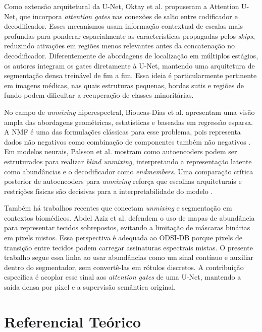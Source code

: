 \documentclass[conference]{IEEEtran}
\begin{document}
Como extensão arquitetural da U-Net, Oktay et al. \cite{oktay2018attentionunet}
propuseram a Attention U-Net, que incorpora \textit{attention gates} nas
conexões de salto entre codificador e decodificador. Esses mecanismos usam
informação contextual de escalas mais profundas para ponderar espacialmente as
características propagadas pelos \textit{skips}, reduzindo ativações em regiões
menos relevantes antes da concatenação no decodificador. Diferentemente de
abordagens de localização em múltiplos estágios, os autores integram os gates
diretamente à U-Net, mantendo uma arquitetura de segmentação densa treinável de
fim a fim. Essa ideia é particularmente pertinente em imagens médicas, nas quais
estruturas pequenas, bordas sutis e regiões de fundo podem dificultar a
recuperação de classes minoritárias.

No campo de \textit{unmixing} hiperespectral, Bioucas-Dias et al.
\cite{bioucasdias2012overview} apresentam uma visão ampla das abordagens
geométricas, estatísticas e baseadas em regressão esparsa. A NMF é uma das
formulações clássicas para esse problema, pois representa dados não negativos
como combinação de componentes também não negativos \cite{lee2000nmf}. Em
modelos neurais, Palsson et al. \cite{palsson2018autoencoder} mostram como
autoencoders podem ser estruturados para realizar \textit{blind unmixing},
interpretando a representação latente como abundâncias e o decodificador como
\textit{endmembers}. Uma comparação crítica posterior de autoencoders para
\textit{unmixing} reforça que escolhas arquiteturais e restrições físicas são
decisivas para a interpretabilidade do modelo \cite{palsson2022critical}.

Também há trabalhos recentes que conectam \textit{unmixing} e segmentação em
contextos biomédicos. Abdel Aziz et al. \cite{abdelaziz2025overlapped} defendem
o uso de mapas de abundância para representar tecidos sobrepostos, evitando a
limitação de máscaras binárias em pixels mistos. Essa perspectiva é adequada ao
ODSI-DB porque pixels de transição entre tecidos
podem carregar assinaturas espectrais mistas. O presente trabalho segue essa
linha ao usar abundâncias como um sinal contínuo e auxiliar dentro do
segmentador, sem convertê-las em rótulos discretos. A contribuição específica é
acoplar esse sinal aos \textit{attention gates} de uma U-Net, mantendo a saída
densa por pixel e a supervisão semântica original.

\section{Referencial Teórico}
\end{document}
